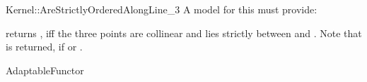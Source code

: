 \begin{ccRefFunctionObjectConcept}{Kernel::AreStrictlyOrderedAlongLine_3}
A model for this must provide:


          {returns , iff the three points are collinear and 
           lies strictly between  and .
          Note that  is returned, if  or
          .}

\ccRefines
AdaptableFunctor

\ccSeeAlso
{}  \\


\end{ccRefFunctionObjectConcept}         

